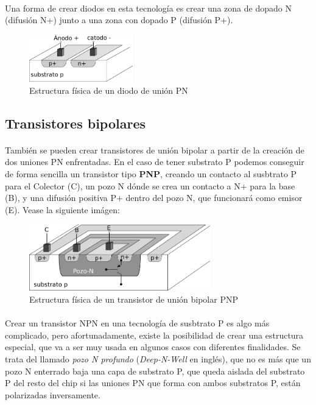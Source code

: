 \paragraph{}
Una forma de crear diodos en esta tecnología es crear una zona de dopado N (difusión N+)
junto a una zona con dopado P (difusión P+).

\begin{figure}[h]
	\centering
	\includegraphics[width=0.4\textwidth]{img/diodo.png}
	\caption{Estructura física de un diodo de unión PN}
	\label{fig:diodo}
\end{figure}

\subsection{Transistores bipolares}\label{cap:bipolares}
\paragraph{}
También se pueden crear transistores de unión bipolar a partir de la creación
de dos uniones PN enfrentadas. En el caso de tener substrato P podemos conseguir
de forma sencilla un transistor tipo \textbf{PNP}, creando un contacto al susbtrato
P para el Colector (C), un pozo N dónde se crea un contacto a N+ para la base (B), y
una difusión positiva P+ dentro del pozo N, que funcionará como emisor (E).
Vease la siguiente imágen:

\begin{figure}[h]
	\centering
	\includegraphics[width=0.7\textwidth]{img/pnp.png}
	\caption{Estructura física de un transistor de unión bipolar PNP}
	\label{fig:pnp}
\end{figure}

\paragraph{}
Crear un transistor NPN en una tecnología de susbtrato P es algo más complicado,
pero afortunadamente, existe la posibilidad de crear una estructura especial, que
va a ser muy usada en algunos casos con diferentes finalidades. Se trata del
llamado \textit{pozo N profundo} (\textit{Deep-N-Well} en inglés), que no
es más que un pozo N enterrado baja una capa de substrato P, que queda aislada del
substrato P del resto del chip si las uniones PN que forma con ambos substratos P,
están polarizadas inversamente.

